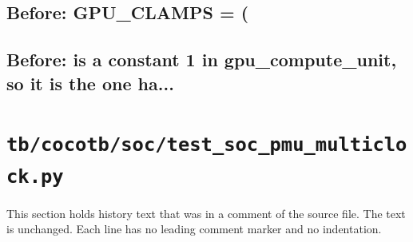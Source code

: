 \begin{record}

\subsection*{Before: GPU\_CLAMPS = (}


\subsection*{Before: is a constant 1 in gpu\_compute\_unit, so it is the one ha...}


\end{record}

\section{\texttt{tb/cocotb/soc/test\_soc\_pmu\_multiclock.py}}\label{cr:suite:soc-test-soc-pmu-multiclock}

This section holds history text that was in a comment of the source file. The text is unchanged. Each line has no leading comment marker and no indentation.

